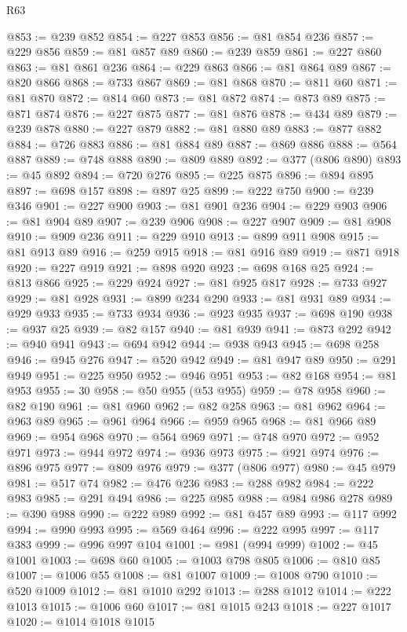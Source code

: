 \begin{lexlean}{R63}
\begin{coremodule}
@853 := @239 @852
@854 := @227 @853
@856 := @81 @854 @236
@857 := @229 @856
@859 := @81 @857 @89
@860 := @239 @859
@861 := @227 @860
@863 := @81 @861 @236
@864 := @229 @863
@866 := @81 @864 @89
@867 := @820 @866
@868 := @733 @867
@869 := @81 @868
@870 := @811 @60
@871 := @81 @870
@872 := @814 @60
@873 := @81 @872
@874 := @873 @89
@875 := @871 @874
@876 := @227 @875
@877 := @81 @876
@878 := @434 @89
@879 := @239 @878
@880 := @227 @879
@882 := @81 @880 @89
@883 := @877 @882
@884 := @726 @883
@886 := @81 @884 @89
@887 := @869 @886
@888 := @564 @887
@889 := @748 @888
@890 := @809 @889
@892 := @377 (@806 @890)
@893 := @45 @892
@894 := @720 @276
@895 := @225 @875
@896 := @894 @895
@897 := @698 @157
@898 := @897 @25
@899 := @222 @750
@900 := @239 @346
@901 := @227 @900
@903 := @81 @901 @236
@904 := @229 @903
@906 := @81 @904 @89
@907 := @239 @906
@908 := @227 @907
@909 := @81 @908
@910 := @909 @236
@911 := @229 @910
@913 := @899 @911 @908
@915 := @81 @913 @89
@916 := @259 @915
@918 := @81 @916 @89
@919 := @871 @918
@920 := @227 @919
@921 := @898 @920
@923 := @698 @168 @25
@924 := @813 @866
@925 := @229 @924
@927 := @81 @925 @817
@928 := @733 @927
@929 := @81 @928
@931 := @899 @234 @290
@933 := @81 @931 @89
@934 := @929 @933
@935 := @733 @934
@936 := @923 @935
@937 := @698 @190
@938 := @937 @25
@939 := @82 @157
@940 := @81 @939
@941 := @873 @292
@942 := @940 @941
@943 := @694 @942
@944 := @938 @943
@945 := @698 @258
@946 := @945 @276
@947 := @520 @942
@949 := @81 @947 @89
@950 := @291 @949
@951 := @225 @950
@952 := @946 @951
@953 := @82 @168
@954 := @81 @953
@955 := 30
@958 := @50 @955 (@53 @955)
@959 := @78 @958
@960 := @82 @190
@961 := @81 @960
@962 := @82 @258
@963 := @81 @962
@964 := @963 @89
@965 := @961 @964
@966 := @959 @965
@968 := @81 @966 @89
@969 := @954 @968
@970 := @564 @969
@971 := @748 @970
@972 := @952 @971
@973 := @944 @972
@974 := @936 @973
@975 := @921 @974
@976 := @896 @975
@977 := @809 @976
@979 := @377 (@806 @977)
@980 := @45 @979
@981 := @517 @74
@982 := @476 @236
@983 := @288 @982
@984 := @222 @983
@985 := @291 @494
@986 := @225 @985
@988 := @984 @986 @278
@989 := @390 @988
@990 := @222 @989
@992 := @81 @457 @89
@993 := @117 @992
@994 := @990 @993
@995 := @569 @464
@996 := @222 @995
@997 := @117 @383
@999 := @996 @997 @104
@1001 := @981 (@994 @999)
@1002 := @45 @1001
@1003 := @698 @60
@1005 := @1003 @798 @805
@1006 := @810 @85
@1007 := @1006 @55
@1008 := @81 @1007
@1009 := @1008 @790
@1010 := @520 @1009
@1012 := @81 @1010 @292
@1013 := @288 @1012
@1014 := @222 @1013
@1015 := @1006 @60
@1017 := @81 @1015 @243
@1018 := @227 @1017
@1020 := @1014 @1018 @1015

\end{coremodule}
\end{lexlean}
